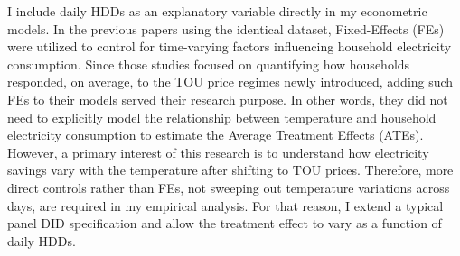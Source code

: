 I include daily HDDs as an explanatory variable directly in my econometric models. In the previous papers using the identical dataset, Fixed-Effects (FEs) were utilized to control for time-varying factors influencing household electricity consumption. Since those studies focused on quantifying how households responded, on average, to the TOU price regimes newly introduced, adding such FEs to their models served their research purpose. In other words, they did not need to explicitly model the relationship between temperature and household electricity consumption to estimate the Average Treatment Effects (ATEs). However, a primary interest of this research is to understand how electricity savings vary with the temperature after shifting to TOU prices. Therefore, more direct controls rather than FEs, not sweeping out temperature variations across days, are required in my empirical analysis. For that reason, I extend a typical panel DID specification and allow the treatment effect to vary as a function of daily HDDs.

